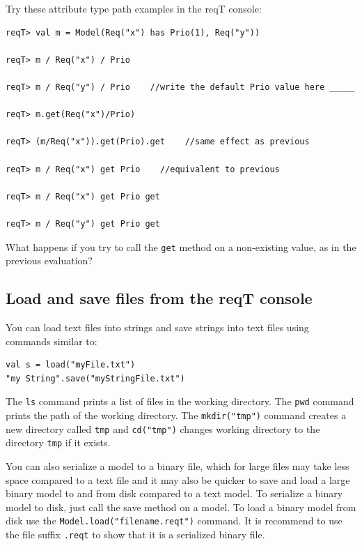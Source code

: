 \documentclass[11pt]{article}
\begin{document}
\begin{framed}\noindent
Try these attribute type path examples in the reqT console: 
{\scriptsize \begin{verbatim}
reqT> val m = Model(Req("x") has Prio(1), Req("y"))

reqT> m / Req("x") / Prio

reqT> m / Req("y") / Prio    //write the default Prio value here _____

reqT> m.get(Req("x")/Prio)

reqT> (m/Req("x")).get(Prio).get    //same effect as previous    

reqT> m / Req("x") get Prio    //equivalent to previous

reqT> m / Req("x") get Prio get    

reqT> m / Req("y") get Prio get    
\end{verbatim}}
\noindent What happens if you try to call the \verb+get+ method on a non-existing value, as in the previous evaluation?
\newline\newline\underline{\hspace{10cm}}
\end{framed}

\subsection{Load and save files from the reqT console}

You can load text files into strings and save strings into text files using commands similar to: 
\begin{verbatim}
val s = load("myFile.txt")
"my String".save("myStringFile.txt")
\end{verbatim}
The \verb+ls+ command prints a list of files in the working directory. The \verb+pwd+ command prints the path of the working directory. The \verb+mkdir("tmp")+ command creates a new directory called \verb+tmp+ and \verb+cd("tmp")+ changes working directory to the directory \verb+tmp+ if it exists.

You can also serialize a model to a binary file, which for large files may take less space compared to a text file and it may also be quicker to save and load a large binary model to and from disk compared to a text model. To serialize a binary model to disk, just call the save method on a model. To load a binary model from disk use the \verb+Model.load("filename.reqt")+ command. It is recommend to use the file suffix \verb+.reqt+ to show that it is a serialized binary file.
\end{document}
